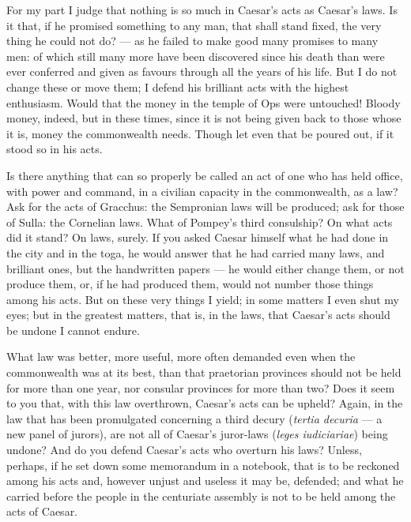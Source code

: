  For my part I judge that nothing is so much in Caesar's acts as Caesar's laws. Is it that, if he promised something to any man, that shall stand fixed, the very thing he could not do? --- as he failed to make good many promises to many men: of which still many more have been discovered since his death than were ever conferred and given as favours through all the years of his life. But I do not change these or move them; I defend his brilliant acts with the highest enthusiasm. Would that the money in the temple of Ops were untouched! Bloody money, indeed, but in these times, since it is not being given back to those whose it is, money the commonwealth needs. Though let even that be poured out, if it stood so in his acts.

 Is there anything that can so properly be called an act of one who has held office, with power and command, in a civilian capacity in the commonwealth, as a law? Ask for the acts of Gracchus: the Sempronian laws will be produced; ask for those of Sulla: the Cornelian laws. What of Pompey's third consulship? On what acts did it stand? On laws, surely. If you asked Caesar himself what he had done in the city and in the toga, he would answer that he had carried many laws, and brilliant ones, but the handwritten papers --- he would either change them, or not produce them, or, if he had produced them, would not number those things among his acts. But on these very things I yield; in some matters I even shut my eyes; but in the greatest matters, that is, in the laws, that Caesar's acts should be undone I cannot endure.

 What law was better, more useful, more often demanded even when the commonwealth was at its best, than that praetorian provinces should not be held for more than one year, nor consular provinces for more than two? Does it seem to you that, with this law overthrown, Caesar's acts can be upheld? Again, in the law that has been promulgated concerning a third decury (\textit{tertia decuria} --- a new panel of jurors), are not all of Caesar's juror-laws (\textit{leges iudiciariae}) being undone? And do you defend Caesar's acts who overturn his laws? Unless, perhaps, if he set down some memorandum in a notebook, that is to be reckoned among his acts and, however unjust and useless it may be, defended; and what he carried before the people in the centuriate assembly is not to be held among the acts of Caesar.

